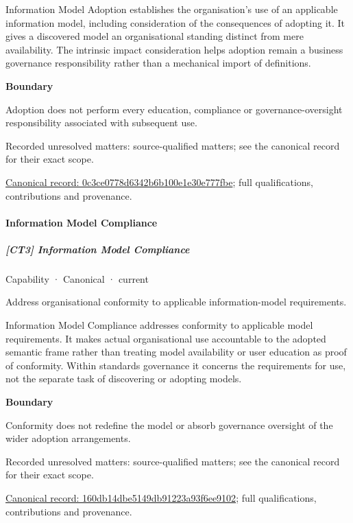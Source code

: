 Information Model Adoption establishes the organisation's use of an applicable information model, including consideration of the consequences of adopting it. It gives a discovered model an organisational standing distinct from mere availability. The intrinsic impact consideration helps adoption remain a business governance responsibility rather than a mechanical import of definitions.



\textbf{Boundary}



Adoption does not perform every education, compliance or governance-oversight responsibility associated with subsequent use.


{\small Recorded unresolved matters: source-qualified matters; see the canonical record for their exact scope.}\par
{\footnotesize \href{../../../../continuum/strategy/capability/0c3ce0778d6342b6b100e1e30e777fbe.md}{Canonical record: 0c3ce0778d6342b6b100e1e30e777fbe}; full qualifications, contributions and provenance.}\par
\paragraph{Information Model Compliance}

\subparagraph{[CT3] Information Model Compliance}

\label{element:160db14dbe5149db91223a93f6ee9102}
{\small Capability · Canonical · current}\par

Address organisational conformity to applicable information-model requirements.



Information Model Compliance addresses conformity to applicable model requirements. It makes actual organisational use accountable to the adopted semantic frame rather than treating model availability or user education as proof of conformity. Within standards governance it concerns the requirements for use, not the separate task of discovering or adopting models.



\textbf{Boundary}



Conformity does not redefine the model or absorb governance oversight of the wider adoption arrangements.


{\small Recorded unresolved matters: source-qualified matters; see the canonical record for their exact scope.}\par
{\footnotesize \href{../../../../continuum/strategy/capability/160db14dbe5149db91223a93f6ee9102.md}{Canonical record: 160db14dbe5149db91223a93f6ee9102}; full qualifications, contributions and provenance.}\par
